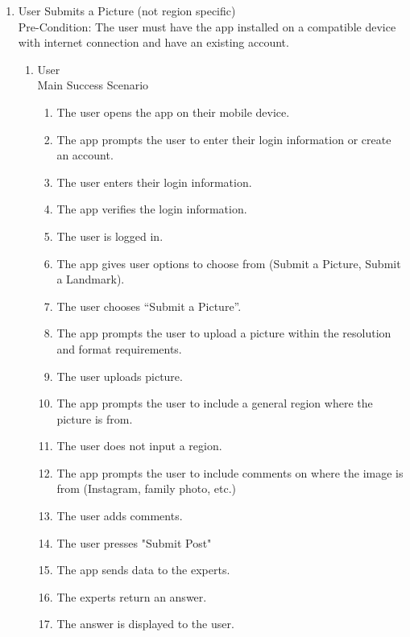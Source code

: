 \documentclass[]{article}
\begin{document}
\begin{enumerate}[{\bf BE1.}]
	\item User Submits a Picture (not region specific)
        \\ Pre-Condition: The user must have the app installed on a compatible device with internet connection and have an existing account. 
		\begin{enumerate}[{\bf VP1.}]
			\item User \\
				Main Success Scenario
                    \begin{enumerate}[{1.}]
                        \item The user opens the app on their mobile device.
                        \item The app prompts the user to enter their login information or create an account.
                        \item The user enters their login information.
                        \item The app verifies the login information.
                        \item The user is logged in.
                        \item The app gives user options to choose from (Submit a Picture, Submit a Landmark). 
                        \item The user chooses “Submit a Picture”. 
                        \item The app prompts the user to upload a picture within the resolution and format requirements.
                        \item The user uploads picture.
                        \item The app prompts the user to include a general region where the picture is from. 
                        \item The user does not input a region. 
                        \item The app prompts the user to include comments on where the image is from (Instagram, family photo, etc.) 
                        \item The user adds comments.
                        \item The user presses "Submit Post"
                        \item The app sends data to the experts.
                        \item The experts return an answer. 
                        \item The answer is displayed to the user. \\
                    \end{enumerate}
                    

\end{enumerate}
\end{enumerate}
\end{document}
